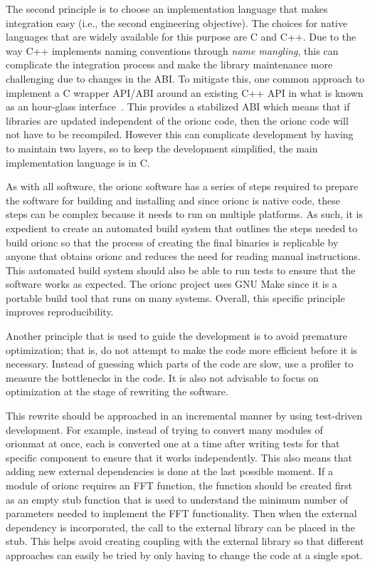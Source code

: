 The second principle is to choose an implementation language that
makes integration easy (i.e., the second engineering objective).
The choices for native languages that are widely available for
this purpose are C and C++. Due to the way C++ implements
naming conventions through \emph{name mangling}, this can
complicate the integration process and make the library
maintenance more challenging due to changes in the \acrshort{ABI}.
To mitigate this, one common approach to implement a C wrapper
\acrshort{API}/\acrshort{ABI} around an existing C++ \acrshort{API}
in what is known as an hour-glass interface~\autocite{CppCon:Hourglass:2014}.
This provides a stabilized \acrshort{ABI} which means that if
libraries are updated independent of the \gls{orionc} code, then
the \gls{orionc} code will not have to be recompiled. However this can
complicate development by having to maintain two layers, so to
keep the development simplified, the main implementation language
is in C.

As with all software, the \gls{orionc} software has a series of
steps required to prepare the software for building and
installing and since \gls{orionc} is native code, these steps can
be complex because it needs to run on multiple platforms. As such,
it is expedient to create an automated build system that outlines
the steps needed to build \gls{orionc} so that the process of
creating the final binaries is replicable by anyone that obtains
\gls{orionc} and reduces the need for reading manual instructions.
This automated build system should also be able to run tests to
ensure that the software works as expected. The \gls{orionc}
project uses GNU Make since it is a portable build tool that runs
on many systems. Overall, this specific principle improves
reproducibility.

Another principle that is used to guide the development is to
avoid premature optimization; that is, do not attempt to make the
code more efficient before it is necessary. Instead of guessing
which parts of the code are slow, use a profiler to measure the
bottlenecks in the code. It is also not advisable to focus on
optimization at the stage of rewriting the software.

This rewrite should be approached in an incremental manner by
using test-driven development. For example, instead of trying to convert many
modules of \gls{orionmat} at once, each is converted one at a
time after writing tests for that specific component to ensure
that it works independently. This also means that adding new
external dependencies is done at the last possible moment. If a
module of \gls{orionc} requires an \acrshort{FFT} function,
the function should be created first as an empty stub function
that is used to understand the minimum number of parameters needed
to implement the FFT functionality. Then when the external dependency
is incorporated, the call to the external library can be placed in
the stub. This helps avoid creating coupling with the external
library so that different approaches can easily be tried by only
having to change the code at a single spot.

